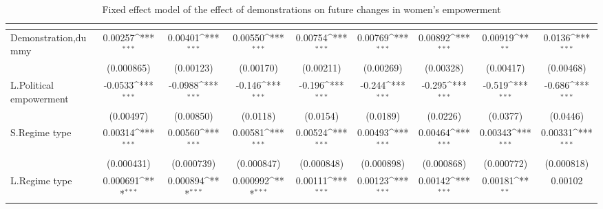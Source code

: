 \begin{table}[htbp]\centering
\def\sym#1{\ifmmode^{#1}\else\(^{#1}\)\fi}
\caption{Fixed effect model of the effect of demonstrations on future changes in women's empowerment \label{polemdemonstrationnowar}}
\begin{tabular}{l*{8}{c}}
\hline\hline
                    &&&&&&&&\\
\hline
Demonstration,dummy &     0.00257\sym{***}&     0.00401\sym{***}&     0.00550\sym{***}&     0.00754\sym{***}&     0.00769\sym{***}&     0.00892\sym{***}&     0.00919\sym{**} &      0.0136\sym{***}\\
                    &  (0.000865)         &   (0.00123)         &   (0.00170)         &   (0.00211)         &   (0.00269)         &   (0.00328)         &   (0.00417)         &   (0.00468)         \\
[1em]
L.Political empowerment&     -0.0533\sym{***}&     -0.0988\sym{***}&      -0.146\sym{***}&      -0.196\sym{***}&      -0.244\sym{***}&      -0.295\sym{***}&      -0.519\sym{***}&      -0.686\sym{***}\\
                    &   (0.00497)         &   (0.00850)         &    (0.0118)         &    (0.0154)         &    (0.0189)         &    (0.0226)         &    (0.0377)         &    (0.0446)         \\
[1em]
S.Regime type       &     0.00314\sym{***}&     0.00560\sym{***}&     0.00581\sym{***}&     0.00524\sym{***}&     0.00493\sym{***}&     0.00464\sym{***}&     0.00343\sym{***}&     0.00331\sym{***}\\
                    &  (0.000431)         &  (0.000739)         &  (0.000847)         &  (0.000848)         &  (0.000898)         &  (0.000868)         &  (0.000772)         &  (0.000818)         \\
[1em]
L.Regime type       &    0.000691\sym{***}&    0.000894\sym{***}&    0.000992\sym{***}&     0.00111\sym{***}&     0.00123\sym{***}&     0.00142\sym{***}&     0.00181\sym{**} &     0.00102         \\

\end{tabular}
\end{table}
